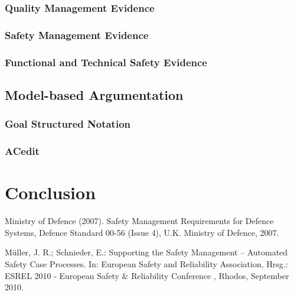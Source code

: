 \documentclass{template/openetcs_report}
\begin{document}
\subsection{Quality Management Evidence}

\subsection{Safety Management Evidence}

\subsection{Functional and Technical Safety Evidence}


\section{Model-based Argumentation}
\subsection{Goal Structured Notation}
\subsection{ACedit}





 
\chapter{Conclusion}






Ministry of Defence (2007). Safety Management Requirements for Defence Systems, Defence Standard 00-56 (Issue 4), U.K. Ministry of Defence, 2007.

Müller, J. R.; Schnieder, E.:
Supporting the Safety Management – Automated Safety Case Processes.
In: European Safety and Reliability Association, Hrsg.: ESREL 2010 - European Safety & Reliability Conference , Rhodos, September 2010.

\end{document}
